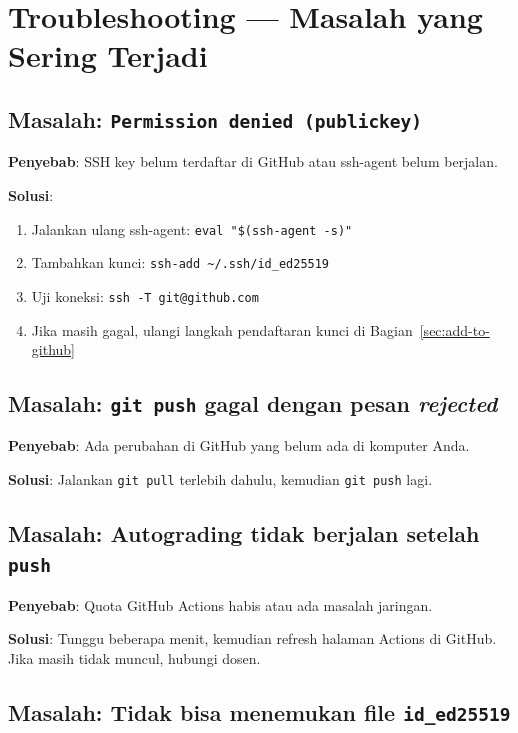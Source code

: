 \documentclass[
    a4paper,
    11pt,
    parskip=half
]{scrartcl}
\begin{document}
\section{Troubleshooting --- Masalah yang Sering Terjadi}
\label{sec:troubleshoot}

\subsection*{Masalah: \texttt{Permission denied (publickey)}}

\textbf{Penyebab}: SSH key belum terdaftar di GitHub atau ssh-agent belum berjalan.

\textbf{Solusi}:
\begin{enumerate}
    \item Jalankan ulang ssh-agent: \texttt{eval "\$(ssh-agent -s)"}
    \item Tambahkan kunci: \texttt{ssh-add \textasciitilde/.ssh/id\_ed25519}
    \item Uji koneksi: \texttt{ssh -T git@github.com}
    \item Jika masih gagal, ulangi langkah pendaftaran kunci di Bagian~\ref{sec:add-to-github}
\end{enumerate}

\subsection*{Masalah: \texttt{git push} gagal dengan pesan \textit{rejected}}

\textbf{Penyebab}: Ada perubahan di GitHub yang belum ada di komputer Anda.

\textbf{Solusi}: Jalankan \texttt{git pull} terlebih dahulu, kemudian \texttt{git push} lagi.

\subsection*{Masalah: Autograding tidak berjalan setelah \texttt{push}}

\textbf{Penyebab}: Quota GitHub Actions habis atau ada masalah jaringan.

\textbf{Solusi}: Tunggu beberapa menit, kemudian refresh halaman Actions di GitHub. Jika masih tidak muncul, hubungi dosen.

\subsection*{Masalah: Tidak bisa menemukan file \texttt{id\_ed25519}}
\end{document}
